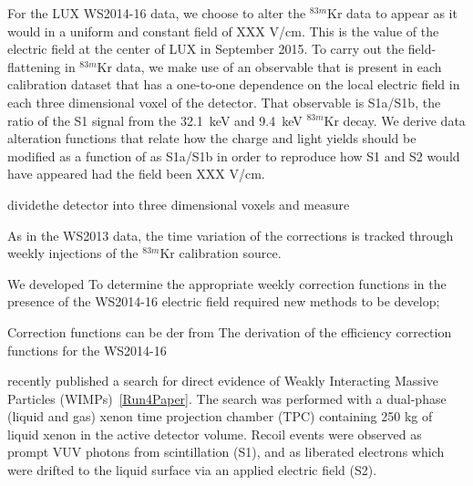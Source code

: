 For the LUX WS2014-16 data, we choose to alter the $^{83m}$Kr data to appear as it would in a 
uniform and constant field of XXX V/cm. This is the value of the electric field at the center of
LUX in September 2015. To carry out the field-flattening in $^{83m}$Kr data, we make use of an observable
that is present in each calibration dataset that 
has a one-to-one dependence on the local electric field in each three dimensional voxel
of the detector. That observable is S1a/S1b, the ratio of the S1 signal from the 32.1~keV and 9.4~keV
$^{83m}$Kr decay. We derive data alteration functions that relate how the charge and light yields
should be modified as a function of as S1a/S1b in order to reproduce how S1 and S2 would 
have appeared had the field been XXX V/cm.




dividethe detector 
into three dimensional voxels and measure







As in the 
WS2013 data, the time variation of the corrections is tracked through weekly injections of the 
$^{83m}$Kr calibration source.




We developed
To determine the appropriate weekly correction functions in the presence of the WS2014-16 electric
field required new methods to be develop;

Correction functions can be der from 
The derivation of the efficiency correction functions for the WS2014-16 







recently published a search for direct evidence of Weakly Interacting Massive Particles (WIMPs)~\ref{Run4Paper}.  The search was performed with a dual-phase (liquid and gas) xenon time projection chamber (TPC) containing 250 kg of liquid xenon in the active detector volume.  Recoil events were observed as prompt VUV photons from scintillation (S1), and as liberated electrons which were drifted to the liquid surface via an applied electric field (S2). 



